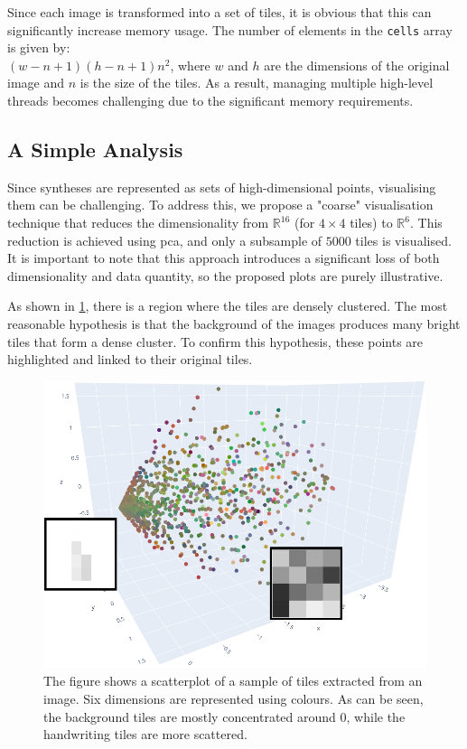 \begin{toReview}
    \noindent Since each image is transformed into a set of tiles, it is obvious that this can significantly increase memory usage. The number of elements in the \texttt{cells} array is given by:\\ $(w-n+1)(h-n+1)n^2$, where $w$ and $h$ are the dimensions of the original image and $n$ is the size of the tiles. As a result, managing multiple high-level threads becomes challenging due to the significant memory requirements.

    \subsection{A Simple Analysis} Since syntheses are represented as sets of high-dimensional points, visualising them can be challenging. To address this, we propose a "coarse" visualisation technique that reduces the dimensionality from $\mathbb{R}^{16}$ (for $4\times4$ tiles) to $\mathbb{R}^6$. This reduction is achieved using \gls{pca}, and only a subsample of $\num{5000}$ tiles is visualised. It is important to note that this approach introduces a significant loss of both dimensionality and data quantity, so the proposed plots are purely illustrative.

    \noindent As shown in \cref{fig:synth_glbvisual}, there is a region where the tiles are densely clustered. The most reasonable hypothesis is that the background of the images produces many bright tiles that form a dense cluster. To confirm this hypothesis, these points are highlighted and linked to their original tiles.

    \begin{figure}[H] \centering \includegraphics[width=0.8\linewidth]{Figures/synth_glbvisual.png}
    	\caption[Global visualisation of a synthesis using PCA]{The figure shows a scatterplot of a sample of tiles extracted from an image. Six dimensions are represented using colours. As can be seen, the background tiles are mostly concentrated around $0$, while the handwriting tiles are more scattered.}
    	\label{fig:synth_glbvisual}
    \end{figure}


\end{toReview}

